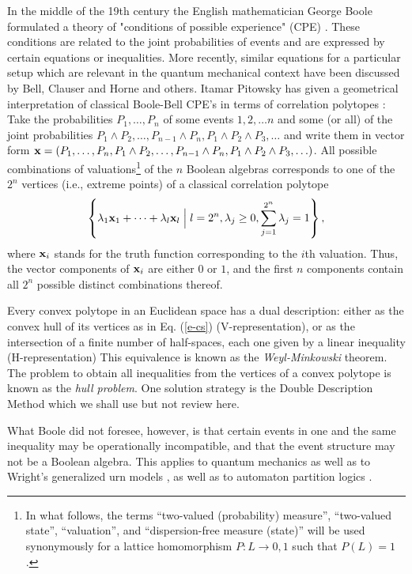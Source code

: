In the middle of the 19th century the English mathematician George Boole
formulated a theory of "conditions of possible experience" (CPE)
\cite{Boole,Boole-62,Hailperin}.
These conditions are related to the joint probabilities of
events and are expressed by certain equations or inequalities.
More recently, similar equations for a particular setup which are relevant in the
quantum mechanical context have been discussed by Bell, Clauser and  Horne and others.
Itamar Pitowsky has given a geometrical interpretation of classical
Boole-Bell  CPE's in terms of correlation polytopes
\cite{pitowsky-89a,pitowsky,Pit-91,Pit-94}:
Take the probabilities $P_1, \ldots ,P_n$ of some events
$1,2,\ldots n$ and some (or all)
of the joint probabilities $P_1\wedge P_2,  \ldots ,P_{n-1}\wedge P_n,
P_1\wedge P_2\wedge P_3,  \ldots  $ and write them in vector form
${\bf x}=(P_1, \ldots ,P_n,P_1\wedge P_2,  \ldots ,P_{n-1}\wedge P_n,
P_1\wedge P_2\wedge P_3,  \ldots)$.
All possible combinations of valuations\footnote{
In what follows, the terms ``two-valued (probability) measure'', ``two-valued state'',
``valuation'', and ``dispersion-free measure (state)'' will be used synonymously
for a lattice homomorphism $P:L\rightarrow {0,1}$ such that $P(L)=1$. }
of the $n$ Boolean algebras
corresponds to one of the $2^n$ vertices (i.e., extreme points)
of a classical correlation polytope
\begin{equation}
\left\{\lambda_1 {\bf x}_1+\cdots +\lambda_l {\bf x}_l \;\Big|\;
l=2^n, \lambda_j\ge 0, \sum_{j=1}^{2^n} \lambda_j=1\right\}
,
\label{e-cs}
\end{equation}
where ${\bf x}_i$ stands for the truth function corresponding to the $i$th valuation.
Thus, the vector components of ${\bf x}_i$ are either $0$ or $1$,
and the first $n$ components contain all $2^n$ possible distinct combinations thereof.

Every convex polytope in an Euclidean space has a dual description:
either as the convex hull of its vertices as in Eq. (\ref{e-cs}) (V-representation),
or as the intersection of a finite number of half-spaces,
each one given by a linear inequality (H-representation)
This equivalence is known as the \emph{Weyl-Minkowski} theorem.
The problem to obtain all inequalities from the vertices of a convex
polytope is known as the \emph{hull problem}. One solution strategy
is the Double Description Method  which we shall use but not review here.


What Boole did not foresee, however, is that certain events
in one and the same inequality may be operationally incompatible,
and that the event structure may not be a Boolean algebra.
This applies to quantum mechanics as well as to Wright's generalized urn models \cite{wright:pent,wright},
as well as to automaton partition logics \cite{svozil-93,schaller-96,svozil-ql}.

